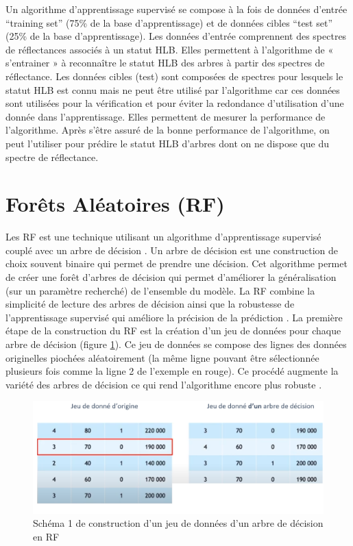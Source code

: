 \documentclass[
  11pt,
  french,
  a4paper,
  extrafontsizes,onecolumn,openright
  ]{memoir}
\begin{document}
Un algorithme d'apprentissage supervisé se compose à la fois de données d'entrée ``training set'' (75\% de la base d'apprentissage) et de données cibles ``test set'' (25\% de la base d'apprentissage). Les données d'entrée comprennent des spectres de réflectances associés à un statut HLB. Elles permettent à l'algorithme de « s'entrainer » à reconnaître le statut HLB des arbres à partir des spectres de réflectance. Les données cibles (test) sont composées de spectres pour lesquels le statut HLB est connu mais ne peut être utilisé par l'algorithme car ces données sont utilisées pour la vérification et pour éviter la redondance d'utilisation d'une donnée dans l'apprentissage. Elles permettent de mesurer la performance de l'algorithme. Après s'être assuré de la bonne performance de l'algorithme, on peut l'utiliser pour prédire le statut HLB d'arbres dont on ne dispose que du spectre de réflectance.

\vfill
\newpage

\hypertarget{foruxeats-aluxe9atoires-rf}{%
\section{Forêts Aléatoires (RF)}\label{foruxeats-aluxe9atoires-rf}}

Les RF est une technique utilisant un algorithme d'apprentissage supervisé couplé avec un arbre de décision \autocite{randomForest}. Un arbre de décision est une construction de choix souvent binaire qui permet de prendre une décision. Cet algorithme permet de créer une forêt d'arbres de décision qui permet d'améliorer la généralisation (sur un paramètre recherché) de l'ensemble du modèle. La RF combine la simplicité de lecture des arbres de décision ainsi que la robustesse de l'apprentissage supervisé qui améliore la précision de la prédiction \autocite{moutarde_arbres_2017}.
La première étape de la construction du RF est la création d'un jeu de données pour chaque arbre de décision (figure \ref{fig:11}). Ce jeu de données se compose des lignes des données originelles piochées aléatoirement (la même ligne pouvant être sélectionnée plusieurs fois comme la ligne 2 de l'exemple en rouge). Ce procédé augmente la variété des arbres de décision ce qui rend l'algorithme encore plus robuste \autocite{moutarde_arbres_2017}.

\scriptsize

\begin{figure}

{\centering \includegraphics[width=0.8\linewidth]{Images/Figure11} 

}

\caption{Schéma 1 de construction d’un jeu de données d’un arbre de décision en RF}\label{fig:11}
\end{figure}
\end{document}
